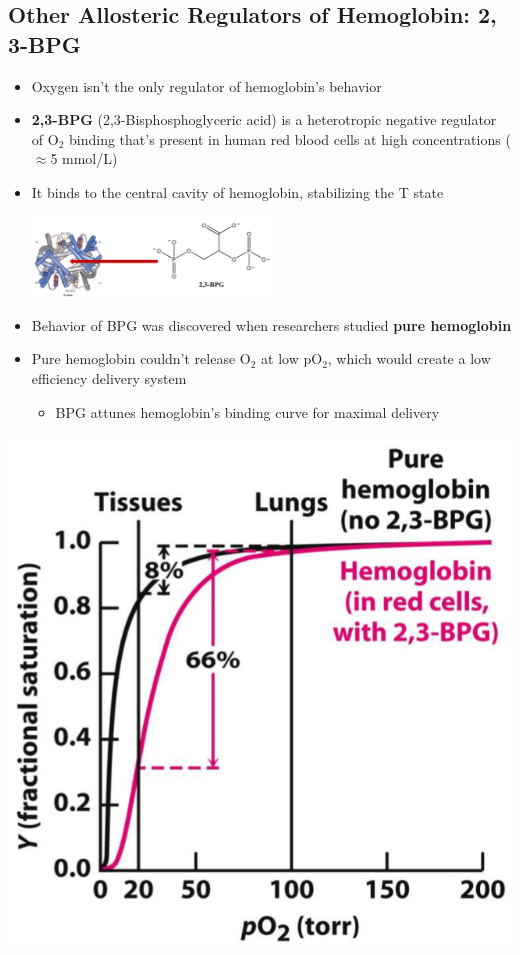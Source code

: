 \documentclass[10pt]{article}
\begin{document}
\subsection*{Other Allosteric Regulators of Hemoglobin: 2, 3-BPG}
\begin{itemize}
    \item Oxygen isn't the only regulator of hemoglobin's behavior
    \item \textbf{2,3-BPG} (2,3-Bisphosphoglyceric acid) is a heterotropic negative regulator of O$_2$ binding that's present in human red blood cells at high concentrations ($\approx$5 mmol/L)
    \item It binds to the central cavity of hemoglobin, stabilizing the T state
    \begin{center}
        \includegraphics*[width=0.5\textwidth]{L3_17.png}
    \end{center}
    \item Behavior of BPG was discovered when researchers studied \textbf{pure hemoglobin}
    \item Pure hemoglobin couldn't release O$_2$ at low pO$_2$, which would create a low efficiency delivery system
    \begin{itemize}
        \item BPG attunes hemoglobin's binding curve for maximal delivery
    \end{itemize}
\end{itemize}
\begin{center}
    \includegraphics*[scale=0.5]{L3_18.png}
\end{center}
\end{document}
